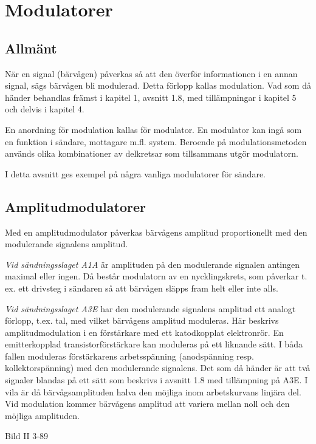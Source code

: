 \section{Modulatorer}

\subsection{Allmänt}

När en signal (bärvågen) påverkas så att den överför informationen i
en annan signal, sägs bärvågen bli modulerad. Detta förlopp kallas
modulation. Vad som då händer behandlas främst i kapitel 1, avsnitt
1.8, med tillämpningar i kapitel 5 och delvis i kapitel 4.

En anordning för modulation kallas för modulator. En modulator kan
ingå som en funktion i sändare, mottagare m.fl. system.  Beroende på
modulationsmetoden används olika kombinationer av delkretsar som
tillsammans utgör modulatorn.

I detta avsnitt ges exempel på några vanliga modulatorer för sändare.

\subsection{Amplitudmodulatorer}

Med en amplitudmodulator påverkas bärvågens amplitud proportionellt
med den modulerande signalens amplitud.

\emph{Vid sändningsslaget A1A} är amplituden på den modulerande
signalen antingen maximal eller ingen. Då består modulatorn av en
nycklingskrets, som påverkar t. ex. ett drivsteg i sändaren så att
bärvågen släpps fram helt eller inte alls.

\emph{Vid sändningsslaget A3E} har den modulerande signalens amplitud
ett analogt förlopp, t.ex. tal, med vilket bärvågens amplitud
moduleras. Här beskrivs amplitudmodulation i en förstärkare med ett
katodkopplat elektronrör. En emitterkopplad transistorförstärkare kan
moduleras på ett liknande sätt. I båda fallen moduleras förstärkarens
arbetsspänning (anodspänning resp. kollektorspänning) med den
modulerande signalens. Det som då händer är att två signaler blandas
på ett sätt som beskrivs i avsnitt 1.8 med tillämpning på A3E. I vila
är då bärvågsamplituden halva den möjliga inom arbetskurvans linjära
del. Vid modulation kommer bärvågens amplitud att variera mellan noll
och den möjliga amplituden.

Bild II 3-89

